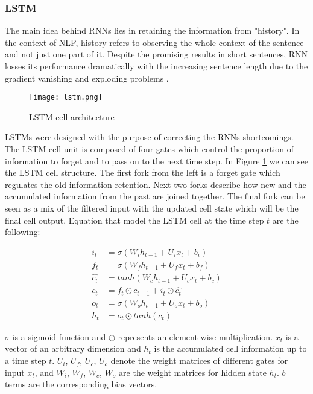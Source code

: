 \subsubsection{LSTM}
The main idea behind RNNs lies in retaining the information from "history".
In the context of NLP, history refers to observing the whole context of the
sentence and not just one part of it. Despite the promising results in short
sentences, RNN losses its performance dramatically with the increasing sentence
length due to the gradient vanishing and exploding problems \cite{gradient}.

\begin{figure}
  \caption{LSTM cell architecture}
  \label{fig:lstm}
  \centering
    \texttt{[image: lstm.png]}
\end{figure}

LSTMs were designed with the purpose of correcting the RNNs shortcomings. The LSTM
cell unit is composed of four gates which control the proportion of
information to forget and to pass on to the next time step. In Figure
\ref{fig:lstm} we can see the LSTM cell structure. The first fork from the left
is a forget gate which regulates the old information retention. Next two forks 
describe how new and the accumulated information from the past are joined
together. The final fork can be seen as a mix of the filtered input with the
updated cell state which will be the final cell output. Equation that model the
LSTM cell at the time step $t$ are the following:

\begin{align*}
        i_t &= \sigma\left(W_ih_{t-1} + U_{i}x_t + b_i\right)\\
        f_t &= \sigma\left(W_fh_{t-1} + U_{f}x_t + b_f\right)\\
        \hat{c_t} &= tanh\left(W_ch_{t-1} + U_{c}x_t + b_c\right)\\
        c_t &=  f_t \odot c_{t-1} + i_t \odot \hat{c_t}\\
        o_t &= \sigma\left(W_oh_{t-1} + U_{o}x_t + b_o\right)\\
        h_t &= o_t \odot tanh(c_t)
\end{align*}

$\sigma$ is a sigmoid function and $\odot$ represents an element-wise
multiplication. $x_t$ is a vector of an arbitrary dimension and $h_t$ is the
accumulated cell information up to a time step $t$. $U_i$, $U_f$, $U_c$, $U_o$
denote the weight matrices of different gates for input $x_t$, and
$W_i$, $W_f$, $W_c$, $W_o$ are the weight matrices for hidden state $h_t$.
$b$ terms are the corresponding bias vectors.

